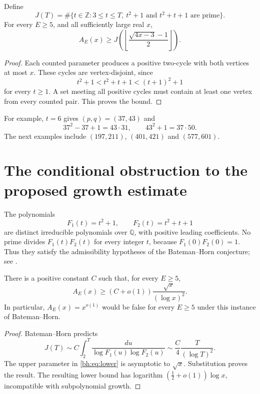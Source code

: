 \begin{theorem}\label{bh:thm:lower}
Define
\[
 J(T)=\#\{t\in\mathbb Z:3\le t\le T,\ t^2+1\text{ and }t^2+t+1\text{ are prime}\}.
\]
For every $E\ge5$, and all sufficiently large real $x$,
\begin{equation}\label{bh:eq:lower}
 \boxed{A_E(x)\ge J\!\left(\left\lfloor\frac{\sqrt{4x-3}-1}{2}\right\rfloor\right).}
\end{equation}
\end{theorem}
\begin{proof}
Each counted parameter produces a positive two-cycle with both vertices at most $x$. These cycles are vertex-disjoint, since
\[
 t^2+1<t^2+t+1<(t+1)^2+1
\]
for every $t\ge1$. A set meeting all positive cycles must contain at least one vertex from every counted pair. This proves the bound.
\end{proof}

For example, $t=6$ gives $(p,q)=(37,43)$ and
\[
 37^2-37+1=43\cdot31,\qquad43^2+1=37\cdot50.
\]
The next examples include $(197,211)$, $(401,421)$ and $(577,601)$.


\section{The conditional obstruction to the proposed growth estimate}
The polynomials
\[
 F_1(t)=t^2+1,\qquad F_2(t)=t^2+t+1
\]
are distinct irreducible polynomials over $\mathbb Q$, with positive leading coefficients. No prime divides $F_1(t)F_2(t)$ for every integer $t$, because $F_1(0)F_2(0)=1$. Thus they satisfy the admissibility hypotheses of the Bateman--Horn conjecture; see \cite[Section 3.6]{bh}.

\begin{corollary}\label{bh:cor:BH}
There is a positive constant $C$ such that, for every $E\ge5$,
\[
 A_E(x)\ge(C+o(1))\frac{\sqrt{x}}{(\log x)^2}.
\]
In particular, $A_E(x)=x^{o(1)}$ would be false for every $E\ge5$ under this instance of Bateman--Horn.
\end{corollary}
\begin{proof}
Bateman--Horn predicts
\[
 J(T)\sim C\int_2^T\frac{du}{\log F_1(u)\log F_2(u)}
 \sim \frac C4\frac{T}{(\log T)^2}.
\]
The upper parameter in \eqref{bh:eq:lower} is asymptotic to $\sqrt{x}$. Substitution proves the result. The resulting lower bound has logarithm $(\tfrac12+o(1))\log x$, incompatible with subpolynomial growth.
\end{proof}

